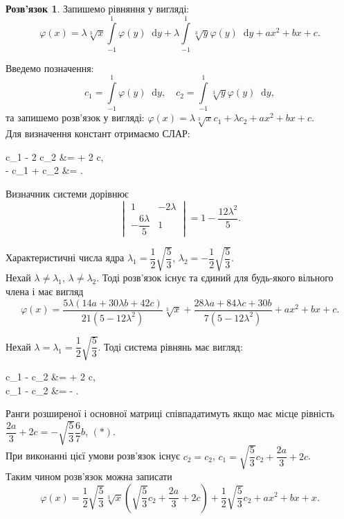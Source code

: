 \documentclass[a4paper, 12pt]{book}
\theoremstyle{definition}
\newtheorem*{solution*}{Розв'язок}
\newcommand*\diff{\mathop{}\!\mathrm{d}}
\renewcommand{\phi}{\varphi}
\newcommand{\Int}{\displaystyle\int\limits}
\newenvironment{system*}{\begin{equation*} \left\{\begin{aligned}}{\end{aligned} \right. \end{equation*}}
\begin{document}
\begin{solution*}
	Запишемо рівняння у вигляді: \[\phi(x) = \lambda \sqrt[3]{x} \Int_{-1}^1 \phi(y) \diff y + \lambda \Int_{-1}^1 \sqrt[3]{y} \phi(y) \diff y + ax^2 + bx + c. \]

	Введемо позначення: \[ c_1 = \Int_{-1}^1 \phi(y) \diff y, \quad c_2 = \Int_{-1}^1 \sqrt[3]{y} \phi(y) \diff y, \]
	та запишемо розв’язок у вигляді: $\phi(x) = \lambda \sqrt[3]{x} c_1 + \lambda c_2 + ax^2 + bx + c$. \\

	Для визначення констант отримаємо СЛАР:
	\begin{system*}
		c_1 - 2 \lambda c_2 &=  + 2 c, \\
		-  c_1 + c_2 &= .
	\end{system*}

	Визначник системи дорівнює \[\begin{vmatrix} 1 & - 2 \lambda \\ - \dfrac{6\lambda}{5} & 1 \end{vmatrix} = 1 - \dfrac{12\lambda^2}{5}.\]

	Характеристичні числа ядра $\lambda_1 = \dfrac{1}{2} \sqrt{\dfrac{5}{3}}$, $\lambda_2 = - \dfrac{1}{2} \sqrt{\dfrac{5}{3}}$. \\

	Нехай $\lambda \ne \lambda_1$, $\lambda \ne \lambda_2$. Тоді розв'язок існує та єдиний для будь-якого вільного члена і має вигляд \[ \phi(x) = \dfrac{5 \lambda (14 a + 30 \lambda b + 42 c)}{21 (5 - 12 \lambda^2)} \sqrt[3]{x} + \dfrac{28 \lambda a + 84 \lambda c + 30 b}{7(5 - 12 \lambda^2)} + ax^2 + bx + c. \]

	Нехай $\lambda = \lambda_1 = \dfrac{1}{2} \sqrt{\dfrac{5}{3}}$. Тоді система рівнянь має вигляд:
	\begin{system*}
		c_1 -  c_2 &=  + 2 c, \\
		c_1 -  c_2 &= -  \dfrac{6b}{7}.
	\end{system*}

	Ранги розширеної і основної матриці співпадатимуть якщо має місце рівність $\dfrac{2a}{3} + 2c = - \sqrt{\dfrac{5}{3}} \dfrac{6}{7} b$, $(*)$. \\

	При виконанні цієї умови розв'язок існує $c_2 = c_2$, $c_1 = \sqrt{\dfrac{5}{3}} c_2 + \dfrac{2a}{3} + 2c$. \\

	Таким чином розв'язок можна записати \[ \phi(x) = \dfrac{1}{2} \sqrt{\dfrac{5}{3}} \sqrt[3]{x} \left( \sqrt{\dfrac{5}{3}} c_2 + \dfrac{2a}{3} + 2c \right) + \dfrac{1}{2} \sqrt{\dfrac{5}{3}} c_2 + ax^2 + bx + x. \]


\end{solution*}
\end{document}
